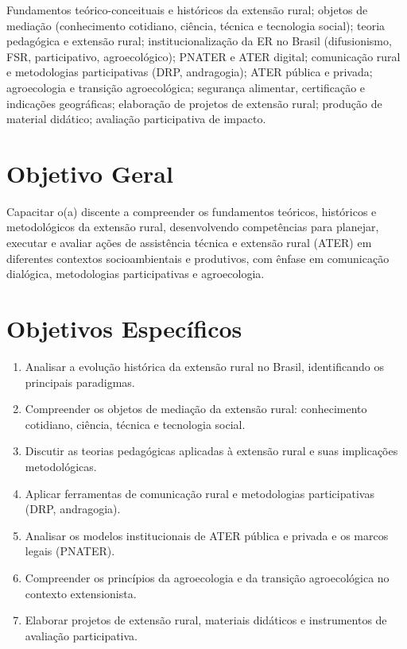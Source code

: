 \documentclass[11pt,a4paper]{article}
\begin{document}
\begin{tcolorbox}[ementabox]
Fundamentos teórico-conceituais e históricos da extensão rural; objetos de mediação (conhecimento cotidiano, ciência, técnica e tecnologia social); teoria pedagógica e extensão rural; institucionalização da ER no Brasil (difusionismo, FSR, participativo, agroecológico); PNATER e ATER digital; comunicação rural e metodologias participativas (DRP, andragogia); ATER pública e privada; agroecologia e transição agroecológica; segurança alimentar, certificação e indicações geográficas; elaboração de projetos de extensão rural; produção de material didático; avaliação participativa de impacto.
\end{tcolorbox}


\section*{Objetivo Geral}

Capacitar o(a) discente a compreender os fundamentos teóricos, históricos e metodológicos da extensão rural, desenvolvendo competências para planejar, executar e avaliar ações de assistência técnica e extensão rural (ATER) em diferentes contextos socioambientais e produtivos, com ênfase em comunicação dialógica, metodologias participativas e agroecologia.

\section*{Objetivos Específicos}

\begin{enumerate}

\item Analisar a evolução histórica da extensão rural no Brasil, identificando os principais paradigmas.

\item Compreender os objetos de mediação da extensão rural: conhecimento cotidiano, ciência, técnica e tecnologia social.

\item Discutir as teorias pedagógicas aplicadas à extensão rural e suas implicações metodológicas.

\item Aplicar ferramentas de comunicação rural e metodologias participativas (DRP, andragogia).

\item Analisar os modelos institucionais de ATER pública e privada e os marcos legais (PNATER).

\item Compreender os princípios da agroecologia e da transição agroecológica no contexto extensionista.

\item Elaborar projetos de extensão rural, materiais didáticos e instrumentos de avaliação participativa.

\end{enumerate}
\end{document}
